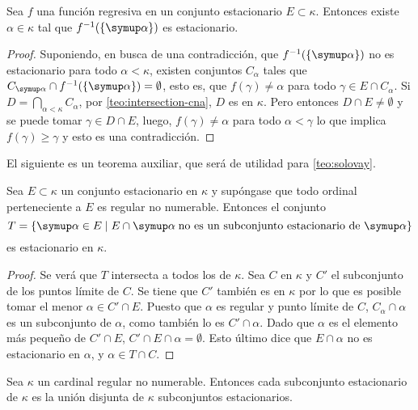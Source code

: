 \begin{teo}[Fodor]\label{teo:fodor}
    Sea $f$ una función regresiva en un conjunto estacionario $E\subset\kappa$.
    Entonces existe $\alpha\in\kappa$ tal que $f^{-1}(\set{\alpha})$ es estacionario.
\end{teo}

\begin{proof}
    Suponiendo, en busca de una contradicción, que $f^{-1}(\set{\alpha})$ no es estacionario
    para todo $\alpha<\kappa$, existen conjuntos \cna{} $C_\alpha$ tales que
    $C_\alpha\cap f^{-1}(\set{\alpha}) = \emptyset$, esto es,
    que $f(\gamma)\neq\alpha$ para todo $\gamma\in E\cap C_\alpha$.
    Si $D=\dint_{\alpha<\kappa} C_\alpha$,
    por \ref{teo:intersection-cna}, $D$ es \cna{} en $\kappa$.
    Pero entonces $D\cap E\neq\emptyset$ y se puede tomar $\gamma\in D\cap E$,
    luego, $f(\gamma)\neq\alpha$ para todo $\alpha<\gamma$
    lo que implica $f(\gamma)\geq\gamma$ y esto es una contradicción.
\end{proof}

El siguiente es un teorema auxiliar, que será de utilidad para \ref{teo:solovay}.

\begin{teo}\label{teo:stationary}
    Sea $E\subset\kappa$ un conjunto estacionario en $\kappa$ y supóngase que todo
    ordinal perteneciente a $E$ es regular no numerable. Entonces el conjunto
    \[
        T=\set{\alpha\in E\mid
            E\cap\alpha\;\text{no es un subconjunto estacionario de $\alpha$}}
    \]
    es estacionario en $\kappa$.
\end{teo}

\begin{proof}
    Se verá que $T$ intersecta a todos los \cna{} de $\kappa$.
    Sea $C$ \cna{} en $\kappa$ y $C'$ el subconjunto de los puntos límite de $C$.
    Se tiene que $C'$ también es \cna{} en $\kappa$ por lo que es posible tomar
    el menor $\alpha\in C'\cap E$.
    Puesto que $\alpha$ es regular y punto límite de $C$, $C_\alpha\cap\alpha$ es un subconjunto
    \cna{} de $\alpha$, como también lo es $C'\cap\alpha$. Dado que $\alpha$ es el elemento
    más pequeño de $C'\cap E$, $C'\cap E\cap\alpha = \emptyset$. Esto último
    dice que $E\cap\alpha$ no es estacionario en $\alpha$, y $\alpha\in T\cap C$.
\end{proof}

\begin{teo}[Solovay]\label{teo:solovay}
    Sea $\kappa$ un cardinal regular no numerable. Entonces cada subconjunto estacionario
    de $\kappa$ es la unión disjunta de $\kappa$ subconjuntos estacionarios.
\end{teo}

